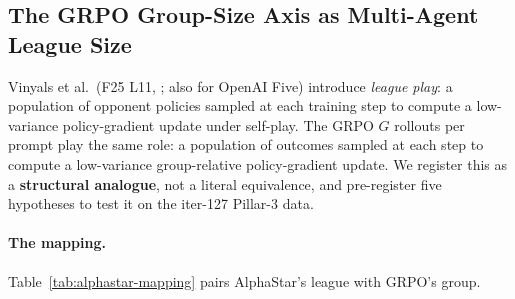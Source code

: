 %
%

\subsection{The GRPO Group-Size Axis as Multi-Agent League Size}
\label{sec:alphastar-league}

Vinyals et al.\ (F25 L11, \citealp{vinyals2019alphastar,vinyals2017sc2le};
also \citealp{berner2019dota} for OpenAI Five) introduce \emph{league
play}: a population of opponent policies sampled at each training step
to compute a low-variance policy-gradient update under self-play. The
GRPO $G$ rollouts per prompt play the same role: a population of
outcomes sampled at each step to compute a low-variance
group-relative policy-gradient update. We register this as a
\textbf{structural analogue}, not a literal equivalence, and pre-register
five hypotheses to test it on the iter-127 Pillar-3 data.

\paragraph{The mapping.}
Table~\ref{tab:alphastar-mapping} pairs AlphaStar's league with GRPO's
group.

